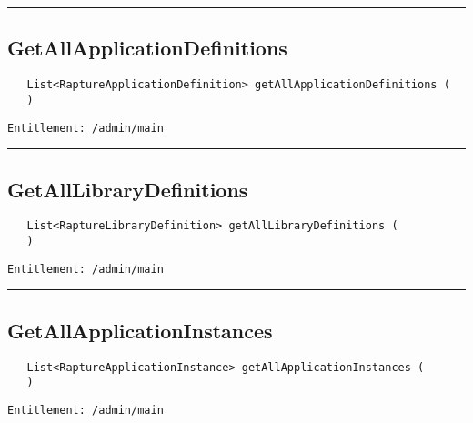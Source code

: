 \rule{12cm}{2pt}
\subsection{GetAllApplicationDefinitions}
\label{Api:GetAllApplicationDefinitions}
\begin{Verbatim}
   List<RaptureApplicationDefinition> getAllApplicationDefinitions (
   )
\end{Verbatim}
\begin{Verbatim}[formatcom=\color{Maroon}]
  Entitlement: /admin/main
\end{Verbatim}



\rule{12cm}{2pt}
\subsection{GetAllLibraryDefinitions}
\label{Api:GetAllLibraryDefinitions}
\begin{Verbatim}
   List<RaptureLibraryDefinition> getAllLibraryDefinitions (
   )
\end{Verbatim}
\begin{Verbatim}[formatcom=\color{Maroon}]
  Entitlement: /admin/main
\end{Verbatim}



\rule{12cm}{2pt}
\subsection{GetAllApplicationInstances}
\label{Api:GetAllApplicationInstances}
\begin{Verbatim}
   List<RaptureApplicationInstance> getAllApplicationInstances (
   )
\end{Verbatim}
\begin{Verbatim}[formatcom=\color{Maroon}]
  Entitlement: /admin/main
\end{Verbatim}



